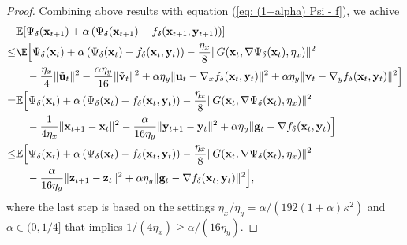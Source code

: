 \documentclass[11pt]{article}
\def\vg{\mathbf{g}}
\def\vu{\mathbf{u}}
\def\vv{\mathbf{v}}
\def\vx{\mathbf{x}}
\def\vy{\mathbf{y}}
\def\vz{\mathbf{z}}
\def\BE{{\mathbb{E}}}
\begin{document}
\begin{proof}
Combining above results with equation (\ref{eq: (1+alpha) Psi - f}), we achive
\begin{align}\label{eq: final (1+alpha) Psi - f}
\begin{split}
&\BE[\Psi_{\delta}(\vx_{t+1})  + \alpha \left( \Psi_{\delta}(\vx_{t+1}) - f_{\delta}(\vx_{t+1}, \vy_{t+1})\right)] 
 \\
\le& \E\Big[ \Psi_{\delta}(\vx_t)  + \alpha \left( \Psi_{\delta}(\vx_{t}) - f_{\delta}(\vx_{t}, \vy_{t})\right)  - \frac{\eta_x}{8} \Vert G(\vx_t,\nabla\Psi_\delta(\vx_t),\eta_x)  \Vert^2   \\
&\quad - \frac{\eta_x}{4} \Vert  \tilde{\vu}_t \Vert^2 - \frac{\alpha \eta_y}{16} \Vert \tilde{\vv}_t  \Vert^2 + \alpha \eta_y \Vert   \vu_t - \nabla_x f_{\delta}( \vx_t,  \vy_t  )\Vert^2 
+ \alpha \eta_y \Vert \vv_t  - \nabla_y f_{\delta}(\vx_t,  \vy_t ) \Vert^2  \Big]
\\
=& 
\BE \Big[ \Psi_{\delta}(\vx_t)+ \alpha \left( \Psi_{\delta}(\vx_{t}) - f_{\delta}(\vx_{t}, \vy_{t})\right) - \frac{\eta_x}{8} \Vert G(\vx_t,\nabla\Psi_\delta(\vx_t),\eta_x)  \Vert^2 \\
&\quad- \frac{1}{4\eta_x} \Vert  \vx_{t+1}-\vx_t \Vert^2 - \frac{\alpha }{16\eta_y} \Vert \vy_{t+1}-\vy_t  \Vert^2 
+\alpha \eta_y \Vert   \vg_t - \nabla f_{\delta}( \vx_t,  \vy_t  ) \Big]\\
\le& 
\BE \Big[ \Psi_{\delta}(\vx_t)+ \alpha \left( \Psi_{\delta}(\vx_{t}) - f_{\delta}(\vx_{t}, \vy_{t})\right) - \frac{\eta_x}{8} \Vert G(\vx_t,\nabla\Psi_\delta(\vx_t),\eta_x)  \Vert^2 \\  
&\quad -\frac{\alpha}{16\eta_y} \Vert \vz_{t+1}-\vz_t  \Vert^2 +\alpha \eta_y \Vert   \vg_t - \nabla f_{\delta}( \vx_t,  \vy_t  )\Vert^2  \Big],
\end{split}
\end{align}
where the last step is based on the settings $\eta_x/\eta_y=\alpha/(192(1+\alpha)\kappa^2)$ and $\alpha\in(0,1/4]$ that implies
$1/(4\eta_x) \geq \alpha/(16\eta_y)$.


\end{proof}
\end{document}
